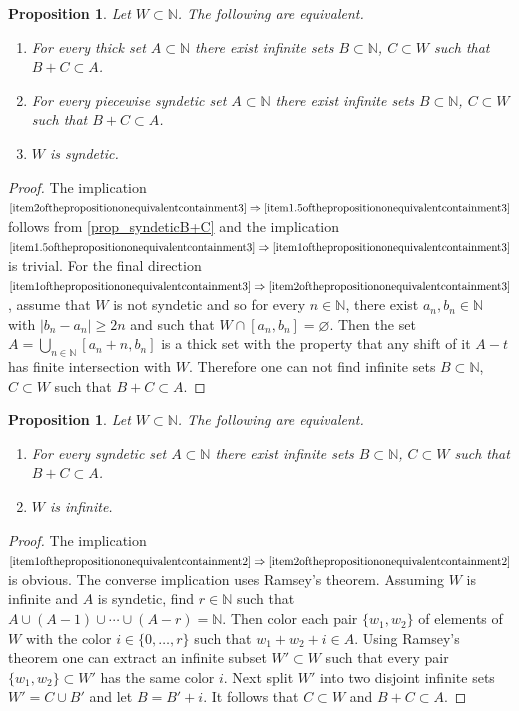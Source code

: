 \documentclass[10pt,dvipsnames]{article}
\newtheorem{proposition}[theorem]{Proposition}
\theoremstyle{definition}
\theoremstyle{plain}
\newcommand{\N}{\mathbb{N}}
\renewcommand{\emptyset}{\varnothing}
\begin{document}
\begin{proposition}
\label{prop:thick_C_repository}
Let $W\subset\N$. 
The following are equivalent.
\begin{enumerate}
\item
\label{item1ofthepropositiononequivalentcontainment3}
For every thick set $A\subset\N$ there exist infinite sets $B\subset\N$, $C\subset W$ such that $B+C\subset A$.
\item
\label{item1.5ofthepropositiononequivalentcontainment3}
For every piecewise syndetic set $A\subset\N$ there exist infinite sets $B\subset\N$, $C\subset W$ such that $B+C\subset A$.
\item
\label{item2ofthepropositiononequivalentcontainment3}
$W$ is syndetic.
\end{enumerate}
\end{proposition}
\begin{proof}
The implication
$
\eqref{item2ofthepropositiononequivalentcontainment3}
\Rightarrow
\eqref{item1.5ofthepropositiononequivalentcontainment3}
$
follows from \cref{prop_syndeticB+C} and the implication $
\eqref{item1.5ofthepropositiononequivalentcontainment3}
\Rightarrow
\eqref{item1ofthepropositiononequivalentcontainment3}
$ is trivial.
For the final direction $
\eqref{item1ofthepropositiononequivalentcontainment3}
\Rightarrow
\eqref{item2ofthepropositiononequivalentcontainment3}
$, assume that $W$ is not syndetic and so for every $n\in\N$, there exist $a_n,b_n\in\N$ with $|b_n-a_n|\geq 2n$ and such that $W\cap [a_n,b_n]=\emptyset$. Then the set  $A=\bigcup_{n\in\N} [a_{n}+n,b_{n}]$ is a thick set with the property that any shift of it $A-t$ has finite intersection with $W$. Therefore one can not find  infinite sets $B\subset\N$, $C\subset W$ such that $B+C\subset A$.
\end{proof}

\begin{proposition}
\label{prop:syndetic-sum}
Let $W\subset\N$. 
The following are equivalent.
\begin{enumerate}
\item
\label{item1ofthepropositiononequivalentcontainment2}
For every syndetic set $A\subset\N$ there exist infinite sets $B\subset\N$, $C\subset W$ such that $B+C\subset A$.
\item
\label{item2ofthepropositiononequivalentcontainment2}
$W$ is infinite.
\end{enumerate}
\end{proposition}
\begin{proof}
The implication
$
\eqref{item1ofthepropositiononequivalentcontainment2}
\Rightarrow
\eqref{item2ofthepropositiononequivalentcontainment2}
$
is obvious.
The converse implication uses Ramsey's theorem.
Assuming $W$ is infinite and $A$ is syndetic, find $r\in\N$ such that $A\cup(A-1)\cup\cdots\cup(A-r)=\N$.
Then color each pair $\{w_1,w_2\}$ of elements of $W$ with the color $i\in\{0,\dots,r\}$ such that $w_1+w_2+i\in A$.
Using Ramsey's theorem one can extract an infinite subset $W'\subset W$ such that every pair $\{w_1,w_2\}\subset W'$ has the same color $i$.
Next split $W'$ into two disjoint infinite sets $W'=C\cup B'$ and let $B=B'+i$.
It follows that $C\subset W$ and $B+C\subset A$.
\end{proof}
\end{document}
